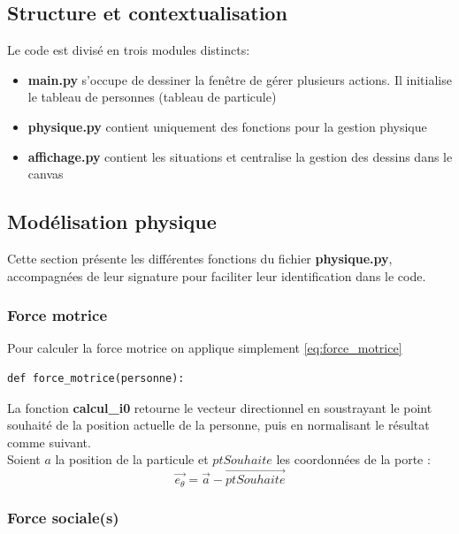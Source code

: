 \documentclass[a4paper,12pt]{article}
\begin{document}
\subsection{Structure et contextualisation}
\noindent Le code est divisé en trois modules distincts:
\begin{itemize}
	\item \textbf{main.py} s'occupe de dessiner la fenêtre de gérer plusieurs actions. Il initialise le tableau de personnes (tableau de particule)
	
	\item \textbf{physique.py} contient uniquement des fonctions pour la gestion physique
	
	\item \textbf{affichage.py} contient les situations et centralise la gestion des dessins dans le canvas
\end{itemize}

\subsection{Modélisation physique}
Cette section présente les différentes fonctions du fichier \textbf{physique.py}, accompagnées de leur signature pour faciliter leur identification dans le code.
\subsubsection{Force motrice}

Pour calculer la force motrice on applique simplement \eqref{eq:force_motrice}

\begin{verbatim}
def force_motrice(personne):
\end{verbatim}

La fonction \textbf{calcul\_i0} retourne le vecteur directionnel en soustrayant le point souhaité de la position actuelle de la personne, puis en normalisant le résultat comme suivant.
\\
\indent Soient $a$ la position de la particule et $ptSouhaite$ les coordonnées de la porte :
\begin{equation}
	\vec{e_\theta} = \vec{a} - \vec{ptSouhaite}
\end{equation}


\subsubsection{Force sociale(s)}
\end{document}
